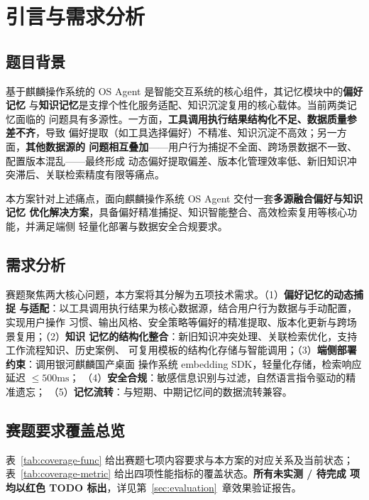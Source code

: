 \section{引言与需求分析}\label{sec:intro}

\subsection{题目背景}

基于麒麟操作系统的 OS Agent 是智能交互系统的核心组件，其记忆模块中的\textbf{偏好记忆}
与\textbf{知识记忆}是支撑个性化服务适配、知识沉淀复用的核心载体。当前两类记忆面临的
问题具有多源性。一方面，\textbf{工具调用执行结果结构化不足、数据质量参差不齐}，导致
偏好提取（如工具选择偏好）不精准、知识沉淀不高效；另一方面，\textbf{其他数据源的
问题相互叠加}——用户行为捕捉不全面、跨场景数据不一致、配置版本混乱——最终形成
动态偏好提取偏差、版本化管理效率低、新旧知识冲突滞后、关联检索精度有限等痛点。

本方案针对上述痛点，面向麒麟操作系统 OS Agent 交付一套\textbf{多源融合偏好与知识记忆
优化解决方案}，具备偏好精准捕捉、知识智能整合、高效检索复用等核心功能，并满足端侧
轻量化部署与数据安全合规要求。

\subsection{需求分析}

赛题聚焦两大核心问题，本方案将其分解为五项技术需求。（1）\textbf{偏好记忆的动态捕捉
与适配}：以工具调用执行结果为核心数据源，结合用户行为数据与手动配置，实现用户操作
习惯、输出风格、安全策略等偏好的精准提取、版本化更新与跨场景复用；（2）\textbf{知识
记忆的结构化整合}：新旧知识冲突处理、关联检索优化，支持工作流程知识、历史案例、
可复用模板的结构化存储与智能调用；（3）\textbf{端侧部署约束}：调用银河麒麟国产桌面
操作系统 embedding SDK，轻量化存储，检索响应延迟 $\le 500\mathrm{ms}$；
（4）\textbf{安全合规}：敏感信息识别与过滤，自然语言指令驱动的精准遗忘；
（5）\textbf{记忆流转}：与短期、中期记忆间的数据流转兼容。

\subsection{赛题要求覆盖总览}\label{sec:coverage}

表~\ref{tab:coverage-func} 给出赛题七项内容要求与本方案的对应关系及当前状态；
表~\ref{tab:coverage-metric} 给出四项性能指标的覆盖状态。\textbf{所有未实测 / 待完成
项均以红色 TODO 标出}，详见第~\ref{sec:evaluation}~章效果验证报告。

